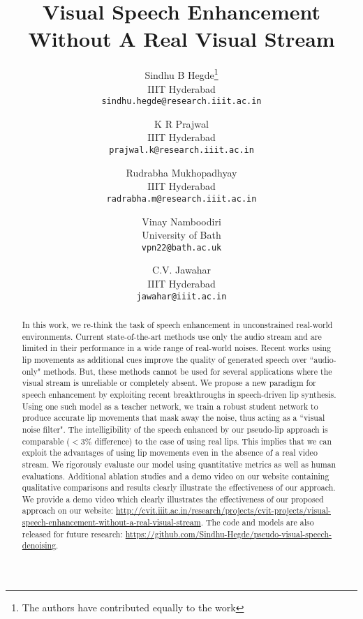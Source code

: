 \documentclass[10pt,twocolumn,letterpaper]{article}
\begin{document}
\title{Visual Speech Enhancement Without A Real Visual Stream}

\author{Sindhu B Hegde\thanks{The authors have contributed equally to the work}\\
IIIT Hyderabad\\
{\tt\small sindhu.hegde@research.iiit.ac.in}
\and
K R Prajwal\footnotemark[1]\\
IIIT Hyderabad\\
{\tt\small prajwal.k@research.iiit.ac.in}

\and
Rudrabha Mukhopadhyay\footnotemark[1]\\
IIIT Hyderabad\\
{\tt\small radrabha.m@research.iiit.ac.in}

\and
Vinay Namboodiri\\
University of Bath\\
{\tt\small vpn22@bath.ac.uk}

\and
C.V. Jawahar\\
IIIT Hyderabad\\
{\tt\small jawahar@iiit.ac.in}
}

\maketitle
\begin{abstract}
In this work, we re-think the task of speech enhancement in unconstrained real-world environments. Current state-of-the-art methods use only the audio stream and are limited in their performance in a wide range of real-world noises. Recent works using lip movements as additional cues improve the quality of generated speech over ``audio-only" methods. But, these methods cannot be used for several applications where the visual stream is unreliable or completely absent. We propose a new paradigm for speech enhancement by exploiting recent breakthroughs in speech-driven lip synthesis. Using one such model as a teacher network, we train a robust student network to produce accurate lip movements that mask away the noise, thus acting as a ``visual noise filter". The intelligibility of the speech enhanced by our pseudo-lip approach is comparable ($< 3\%$ difference) to the case of using real lips. This implies that we can exploit the advantages of using lip movements even in the absence of a real video stream. We rigorously evaluate our model using quantitative metrics as well as human evaluations. Additional ablation studies and a demo video on our website containing qualitative comparisons and results clearly illustrate the effectiveness of our approach. We provide a demo video which clearly illustrates the effectiveness of our proposed approach on our website: \scriptsize{\url{http://cvit.iiit.ac.in/research/projects/cvit-projects/visual-speech-enhancement-without-a-real-visual-stream}}. 
\normalsize{The code and models are also released for future research:} \scriptsize{\url{https://github.com/Sindhu-Hegde/pseudo-visual-speech-denoising}}.
\end{abstract}
\end{document}
